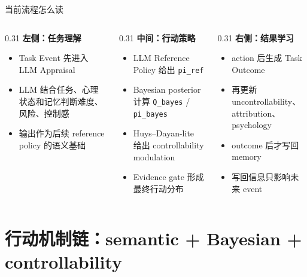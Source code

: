 \documentclass[aspectratio=169]{beamer}
\begin{document}
\begin{frame}[t]{当前流程怎么读}
\small
\begin{columns}[T]
\begin{column}{0.31\textwidth}
\textbf{左侧：任务理解}
\begin{itemize}
    \item Task Event 先进入 LLM Appraisal
    \item LLM 结合任务、心理状态和记忆判断难度、风险、控制感
    \item 输出作为后续 reference policy 的语义基础
\end{itemize}
\end{column}

\begin{column}{0.31\textwidth}
\textbf{中间：行动策略}
\begin{itemize}
    \item LLM Reference Policy 给出 \texttt{pi\_ref}
    \item Bayesian posterior 计算 \texttt{Q\_bayes} / \texttt{pi\_bayes}
    \item Huys--Dayan-lite 给出 controllability modulation
    \item Evidence gate 形成最终行动分布
\end{itemize}
\end{column}

\begin{column}{0.31\textwidth}
\textbf{右侧：结果学习}
\begin{itemize}
    \item action 后生成 Task Outcome
    \item 再更新 uncontrollability、attribution、psychology
    \item outcome 后才写回 memory
    \item 写回信息只影响未来 event
\end{itemize}
\end{column}
\end{columns}
\end{frame}

\section{行动机制链：semantic + Bayesian + controllability}
\end{document}
